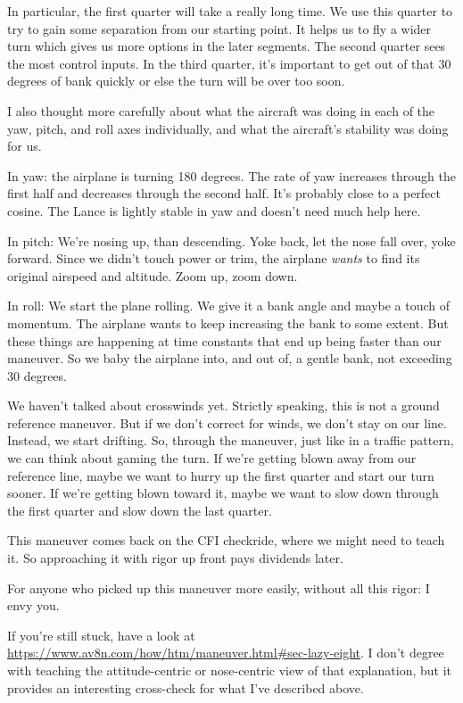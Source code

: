 In particular, the first quarter will take a really long time. We use this quarter to try to gain some separation from our starting point. It helps us to fly a wider turn which gives us more options in the later segments. The second quarter sees the most control inputs. In the third quarter, it's important to get out of that 30 degrees of bank quickly or else the turn will be over too soon.

I also thought more carefully about what the aircraft was doing in each of the yaw, pitch, and roll axes individually, and what the aircraft's stability was doing for us.

In yaw: the airplane is turning 180 degrees. The rate of yaw increases through the first half and decreases through the second half. It's probably close to a perfect cosine. The Lance is lightly stable in yaw and doesn't need much help here.

In pitch: We're nosing up, than descending. Yoke back, let the nose fall over, yoke forward. Since we didn't touch power or trim, the airplane \emph{wants} to find its original airspeed and altitude. Zoom up, zoom down.

In roll: We start the plane rolling. We give it a bank angle and maybe a touch of momentum. The airplane wants to keep increasing the bank to some extent. But these things are happening at time constants that end up being faster than our maneuver. So we baby the airplane into, and out of, a gentle bank, not exceeding 30 degrees.

We haven't talked about crosswinds yet. Strictly speaking, this is not a ground reference maneuver. But if we don't correct for winds, we don't stay on our line. Instead, we start drifting. So, through the maneuver, just like in a traffic pattern, we can think about gaming the turn. If we're getting blown away from our reference line, maybe we want to hurry up the first quarter and start our turn sooner. If we're getting blown toward it, maybe we want to slow down through the first quarter and slow down the last quarter.

This maneuver comes back on the CFI checkride, where we might need to teach it. So approaching it with rigor up front pays dividends later.

For anyone who picked up this maneuver more easily, without all this rigor: I envy you.

If you're still stuck, have a look at \url{https://www.av8n.com/how/htm/maneuver.html#sec-lazy-eight}. I don't degree with teaching the attitude-centric or nose-centric view of that explanation, but it provides an interesting cross-check for what I've described above.

